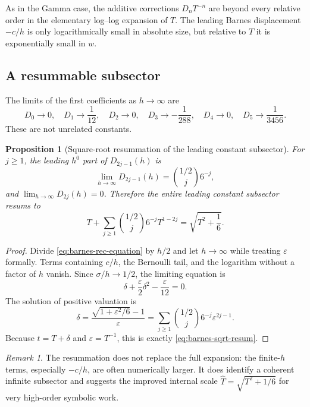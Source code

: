 \documentclass[11pt]{article}
\newtheorem{proposition}[theorem]{Proposition}
\theoremstyle{definition}
\theoremstyle{remark}
\newtheorem{remark}[theorem]{Remark}
\begin{document}
As in the Gamma case, the additive corrections \(D_nT^{-n}\) are beyond every relative order in the elementary log--log expansion of \(T\).  The leading Barnes displacement
\(-c/h\) is only logarithmically small in absolute size, but relative to
\(T\) it is exponentially small in \(w\).

\subsection{A resummable subsector}\label{sec:barnes-resum}

The limits of the first coefficients as \(h\to\infty\) are
\[
 D_0\to0,
 \quad D_1\to\frac1{12},
 \quad D_2\to0,
 \quad D_3\to-\frac1{288},
 \quad D_4\to0,
 \quad D_5\to\frac1{3456}.
\]
These are not unrelated constants.

\begin{proposition}[Square-root resummation of the leading constant subsector]\label{prop:barnes-resum}
For \(j\ge1\), the leading \(h^0\) part of \(D_{2j-1}(h)\) is
\begin{equation}\label{eq:barnes-limit-coeff}
 \lim_{h\to\infty}D_{2j-1}(h)
 =\binom{1/2}{j}6^{-j},
\end{equation}
and \(\lim_{h\to\infty}D_{2j}(h)=0\).  Therefore the entire leading constant subsector resums to
\begin{equation}\label{eq:barnes-sqrt-resum}
 T+\sum_{j\ge1}\binom{1/2}{j}6^{-j}T^{1-2j}
 =\sqrt{T^2+\frac16}.
\end{equation}
\end{proposition}

\begin{proof}
Divide \cref{eq:barnes-rec-equation} by \(h/2\) and let \(h\to\infty\) while treating \(\varepsilon\) formally.  Terms containing \(c/h\), the Bernoulli tail, and the logarithm without a factor of \(h\) vanish.  Since \(\sigma/h\to1/2\), the limiting equation is
\[
 \delta+\frac{\varepsilon}{2}\delta^2-\frac{\varepsilon}{12}=0.
\]
The solution of positive valuation is
\[
 \delta=\frac{\sqrt{1+\varepsilon^2/6}-1}{\varepsilon}
 =\sum_{j\ge1}\binom{1/2}{j}6^{-j}\varepsilon^{2j-1}.
\]
Because \(t=T+\delta\) and \(\varepsilon=T^{-1}\), this is exactly
\cref{eq:barnes-sqrt-resum}.
\end{proof}

\begin{remark}
The resummation does not replace the full expansion: the finite-\(h\) terms, especially \(-c/h\), are often numerically larger.  It does identify a coherent infinite subsector and suggests the improved internal scale
\(\widehat T=\sqrt{T^2+1/6}\) for very high-order symbolic work.
\end{remark}
\end{document}
